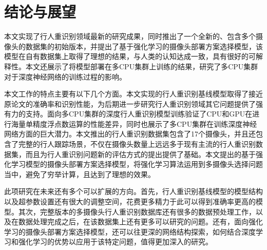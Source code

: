 \chapter{结论与展望}\label{sec:conclusion}

本文实现了行人重识别领域最新的研究成果，同时推出了一个全新的、包含多个摄像头的数据集的初始版本，并提出了基于强化学习的摄像头部署方案选择模型，该模型在自有数据集上取得了理想的结果，与人类的认知达成一致，具有很好的可解释性。本文还展示了将模型部署在多CPU集群上训练的结果，研究了多CPU集群对于深度神经网络的训练过程的影响。

本文工作的特点主要有以下几个方面。本文实现的行人重识别基线模型取得了接近原论文的准确率和识别性能，为后期进一步研究行人重识别领域其它问题提供了强有力的支持。面向多CPU集群的深度行人重识别模型训练验证了CPU和GPU在进行海量单精度浮点数运算的性能差异，同时也展示了多CPU集群在训练深度神经网络方面的巨大潜力。本文推出的行人重识别数据集包含了17个摄像头，并且还包含了完整的行人跟踪场景，不仅在摄像头数量上远远多于现有主流的行人重识别数据集，而且为行人重识别问题新的评估方式的提出提供了基础。本文提出的基于强化学习模型的摄像头部署方案选择模型，将强化学习算法运用到多摄像头选择问题当中，避免了穷举计算，且达到了理想的效果。

此项研究在未来还有多个可以扩展的方向。首先，行人重识别基线模型的模型结构以及超参数设置还有很大的调整空间，花费更多精力于此可以得到准确率更高的模型。其次，完整版本的多摄像头行人重识别数据库还有很多的数据预处理工作，以及在数据处理完成之后，在该数据集上还有更多可以研究的问题。还有，面向强化学习的摄像头部署方案选择模型，还可以往更深的网络结构探索，如何结合深度学习和强化学习的优势以应用于该特定问题，值得更加深入的研究。